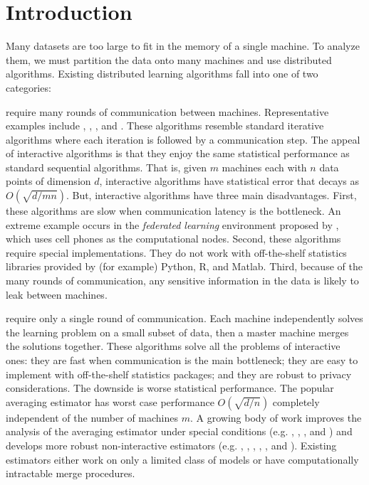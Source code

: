 \documentclass[../main.tex]{subfiles}
\begin{document}
\chapter{Introduction}



Many datasets are too large to fit in the memory of a single machine.
To analyze them, we must partition the data onto many machines and use distributed algorithms.
Existing distributed learning algorithms fall into one of two categories:

 require many rounds of communication between machines.
Representative examples include \citet{boyd2011distributed}, \citet{li2014scaling}, \cite{ma2015adding}, and \cite{zhao2017scope}. 
These algorithms resemble standard iterative algorithms where each iteration is followed by a communication step. 
The appeal of interactive algorithms is that they enjoy the same statistical performance as standard sequential algorithms.
That is, given $m$ machines each with $n$ data points of dimension $d$, interactive algorithms have statistical error that decays as $O(\sqrt{d/mn})$.
But, interactive algorithms have three main disadvantages.
First, these algorithms are slow when communication latency is the bottleneck.
An extreme example occurs in the \emph{federated learning} environment proposed by \cite{mcmahan2017communication}, which uses cell phones as the computational nodes. 
Second, these algorithms require special implementations.
They do not work with off-the-shelf statistics libraries provided by (for example) Python, R, and Matlab.
Third, because of the many rounds of communication, any sensitive information in the data is likely to leak between machines.

 require only a single round of communication.
Each machine independently solves the learning problem on a small subset of data,
then a master machine merges the solutions together.
These algorithms solve all the problems of interactive ones:
they are fast when communication is the main bottleneck;
they are easy to implement with off-the-shelf statistics packages;
and they are robust to privacy considerations.
The downside is worse statistical performance.
The popular averaging estimator has worst case performance $O(\sqrt{d/n})$ completely independent of the number of machines $m$. 
A growing body of work improves the analysis of the averaging estimator under special conditions 
(e.g.
\citet{mcdonald2009efficient},
\citet{zhang2012communication},
\citet{zhang2013divide},
and
\citet{rosenblatt2016optimality})
and develops more robust non-interactive estimators
(e.g.
\citet{zinkevich2010parallelized},
\citet{liu2014distributed},  
\citet{lee2015communication}, 
\citet{battey2015distributed},
\citet{han2016bootstrap},
and \citet{jordan2016communication}).
Existing estimators either work on only a limited class of models or have computationally intractable merge procedures.
\end{document}
